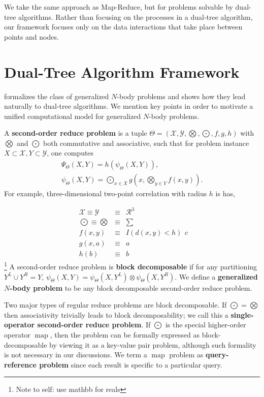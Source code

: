\documentclass[times, leqno,twocolumn]{article}
\newcommand{\authornote}[1]{\footnote{Note to self: #1}}
\newcommand{\authorsnote}[1]{\authornote{#1}}
\newcommand{\union}{\cup}
\DeclareMathOperator*{\map}{map}
\newcommand{\Gnp}{\Psi_{\Theta}}
\newcommand{\gnp}{\psi_{\Theta}}
\newcommand{\defterm}[1]{{\bf #1}}
\newcommand{\kdleft}[1]{#1^{\!L}}
\newcommand{\kdright}[1]{#1^{\!R}}
\begin{document}
We take the same approach as Map-Reduce, but for problems solvable by dual-tree algorithms.
Rather than focusing on the processes in a dual-tree algorithm, our framework focuses only on the data interactions that take place between points and nodes.

\section{Dual-Tree Algorithm Framework}

\cite{ryan_nips} formalizes the class of generalized $N$-body problems and shows how they lead naturally to dual-tree algorithms.
We mention key points in order to motivate a unified computational model for generalized $N$-body problems.

A \defterm{second-order reduce problem} is a tuple $\Theta = (\mathcal{X}, \mathcal{Y}, \bigotimes, \bigodot, f, g, h)$ with $\bigotimes$ and $\bigodot$ both commutative and associative, such that for problem instance $X \subset {\mathcal{X}}, Y \subset {\mathcal{Y}}$, one computes
\[\begin{array}{l}
  \displaystyle \Gnp(X, Y) = h(\gnp(X, Y)),
  \\
  \displaystyle \gnp(X, Y) = \bigodot_{x \in X} g\!\left(x, \bigotimes_{y \in Y} f(x, y) \right).
\end{array}\]
\noindent For example, three-dimensional two-point correlation with radius $h$ is has,

\[\begin{array}{rcl}
  \mathcal{X} \equiv \mathcal{Y} &\equiv& \mathcal{R}^3
  \\
  \bigodot \equiv \bigotimes &\equiv& \sum
  \\
  f(x,y) &\equiv& I(d(x,y) < h)
  \\
  g(x, a) &\equiv& a
  \\
  h(b) &\equiv& b
\end{array}{c}\]
\noindent \authorsnote{use mathbb for reals}
A second-order reduce problem is \defterm{block decomposable} if for any partitioning $\kdleft{Y} \union \kdright{Y} = Y$, $\gnp(X,Y) = \gnp(X,\kdleft{Y}) \otimes \gnp(X,\kdright{Y})$.
We define a \defterm{generalized $N$-body problem} to be any block decomposable second-order reduce problem.

Two major types of regular reduce problems are block decomposable.
If $\bigodot = \bigotimes$ then associativity trivially leads to block decomposability; we call this a \defterm{single-operator second-order reduce problem}.
If $\bigodot$ is the special higher-order operator $\map$, then the problem can be formally expressed as block-decomposable by viewing it as a key-value pair problem, although such formality is not necessary in our discussions.
We term a $\map$ problem as \defterm{query-reference problem} since each result is specific to a particular query.
\end{document}
